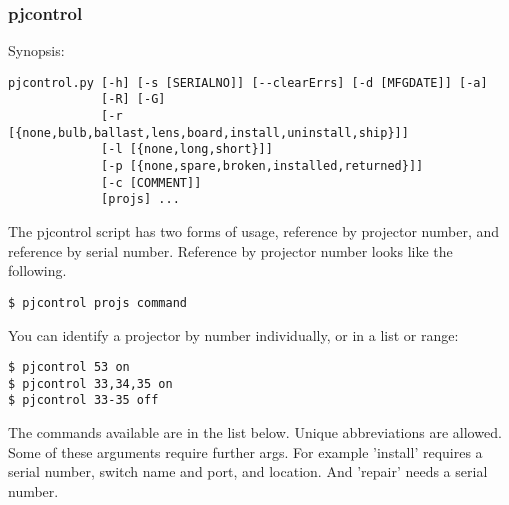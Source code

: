 \documentclass[11pt]{article}
\begin{document}
\subsubsection{pjcontrol}

Synopsis:

\begin{verbatim}
pjcontrol.py [-h] [-s [SERIALNO]] [--clearErrs] [-d [MFGDATE]] [-a]
             [-R] [-G]
             [-r [{none,bulb,ballast,lens,board,install,uninstall,ship}]]
             [-l [{none,long,short}]]
             [-p [{none,spare,broken,installed,returned}]]
             [-c [COMMENT]]
             [projs] ...
\end{verbatim}

The pjcontrol script has two forms of usage, reference by projector
number, and reference by serial number.  Reference by projector number
looks like the following.

\begin{verbatim}
$ pjcontrol projs command
\end{verbatim}

You can identify a projector by number individually, or in a list or
range:

\begin{verbatim}
$ pjcontrol 53 on
$ pjcontrol 33,34,35 on
$ pjcontrol 33-35 off
\end{verbatim}

The commands available are in the list below.  Unique abbreviations
are allowed. Some of these arguments require further args. For example
'install' requires a serial number, switch name and port, and
location. And 'repair' needs a serial number.
\end{document}
